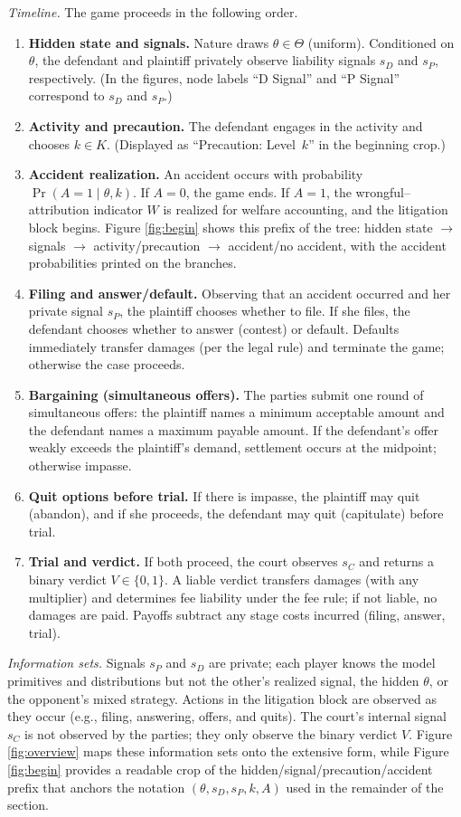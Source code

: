 \documentclass{article}
\begin{document}
\emph{Timeline.} The game proceeds in the following order.
\begin{enumerate}
\item \textbf{Hidden state and signals.} Nature draws $\theta\in\Theta$ (uniform). Conditioned on $\theta$, the defendant and plaintiff privately observe liability signals $s_D$ and $s_P$, respectively. (In the figures, node labels “D Signal” and “P Signal” correspond to $s_D$ and $s_P$.)
\item \textbf{Activity and precaution.} The defendant engages in the activity and chooses $k\in K$. (Displayed as “Precaution: Level $\,k$” in the beginning crop.)
\item \textbf{Accident realization.} An accident occurs with probability $\Pr(A{=}1\mid \theta,k)$. If $A=0$, the game ends. If $A=1$, the wrongful--attribution indicator $W$ is realized for welfare accounting, and the litigation block begins. Figure \ref{fig:begin} shows this prefix of the tree: hidden state $\to$ signals $\to$ activity/precaution $\to$ accident/no accident, with the accident probabilities printed on the branches.
\item \textbf{Filing and answer/default.} Observing that an accident occurred and her private signal $s_P$, the plaintiff chooses whether to file. If she files, the defendant chooses whether to answer (contest) or default. Defaults immediately transfer damages (per the legal rule) and terminate the game; otherwise the case proceeds.
\item \textbf{Bargaining (simultaneous offers).} The parties submit one round of simultaneous offers: the plaintiff names a minimum acceptable amount and the defendant names a maximum payable amount. If the defendant’s offer weakly exceeds the plaintiff’s demand, settlement occurs at the midpoint; otherwise impasse.
\item \textbf{Quit options before trial.} If there is impasse, the plaintiff may quit (abandon), and if she proceeds, the defendant may quit (capitulate) before trial.
\item \textbf{Trial and verdict.} If both proceed, the court observes $s_C$ and returns a binary verdict $V\in\{0,1\}$. A liable verdict transfers damages (with any multiplier) and determines fee liability under the fee rule; if not liable, no damages are paid. Payoffs subtract any stage costs incurred (filing, answer, trial).
\end{enumerate}

\emph{Information sets.} Signals $s_P$ and $s_D$ are private; each player knows the model primitives and distributions but not the other’s realized signal, the hidden $\theta$, or the opponent’s mixed strategy. Actions in the litigation block are observed as they occur (e.g., filing, answering, offers, and quits). The court’s internal signal $s_C$ is not observed by the parties; they only observe the binary verdict $V$. Figure \ref{fig:overview} maps these information sets onto the extensive form, while Figure \ref{fig:begin} provides a readable crop of the hidden/signal/precaution/accident prefix that anchors the notation $(\theta,s_D,s_P,k,A)$ used in the remainder of the section.


\printbibliography
\end{document}
